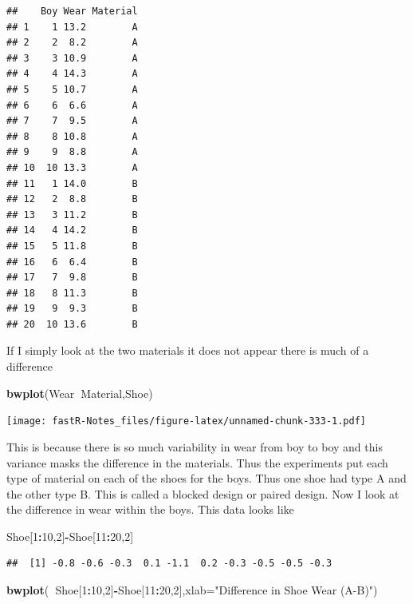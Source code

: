 \documentclass[]{book}
\newenvironment{Shaded}{\begin{snugshade}}{\end{snugshade}}
\newcommand{\KeywordTok}[1]{\textcolor[rgb]{0.13,0.29,0.53}{\textbf{#1}}}
\newcommand{\DataTypeTok}[1]{\textcolor[rgb]{0.13,0.29,0.53}{#1}}
\newcommand{\DecValTok}[1]{\textcolor[rgb]{0.00,0.00,0.81}{#1}}
\newcommand{\StringTok}[1]{\textcolor[rgb]{0.31,0.60,0.02}{#1}}
\newcommand{\OperatorTok}[1]{\textcolor[rgb]{0.81,0.36,0.00}{\textbf{#1}}}
\newcommand{\NormalTok}[1]{#1}
\theoremstyle{definition}
\theoremstyle{definition}
\theoremstyle{definition}
\theoremstyle{remark}
\begin{document}
\begin{verbatim}
##    Boy Wear Material
## 1    1 13.2        A
## 2    2  8.2        A
## 3    3 10.9        A
## 4    4 14.3        A
## 5    5 10.7        A
## 6    6  6.6        A
## 7    7  9.5        A
## 8    8 10.8        A
## 9    9  8.8        A
## 10  10 13.3        A
## 11   1 14.0        B
## 12   2  8.8        B
## 13   3 11.2        B
## 14   4 14.2        B
## 15   5 11.8        B
## 16   6  6.4        B
## 17   7  9.8        B
## 18   8 11.3        B
## 19   9  9.3        B
## 20  10 13.6        B
\end{verbatim}

If I simply look at the two materials it does not appear there is much
of a difference

\begin{Shaded}
\begin{Highlighting}[]
\KeywordTok{bwplot}\NormalTok{(Wear}\OperatorTok{~}\NormalTok{Material,Shoe)}
\end{Highlighting}
\end{Shaded}

\texttt{[image: fastR-Notes\_files/figure-latex/unnamed-chunk-333-1.pdf]}

This is because there is so much variability in wear from boy to boy and
this variance masks the difference in the materials. Thus the
experiments put each type of material on each of the shoes for the boys.
Thus one shoe had type A and the other type B. This is called a blocked
design or paired design. Now I look at the difference in wear within the
boys. This data looks like

\begin{Shaded}
\begin{Highlighting}[]
\NormalTok{Shoe[}\DecValTok{1}\OperatorTok{:}\DecValTok{10}\NormalTok{,}\DecValTok{2}\NormalTok{]}\OperatorTok{-}\NormalTok{Shoe[}\DecValTok{11}\OperatorTok{:}\DecValTok{20}\NormalTok{,}\DecValTok{2}\NormalTok{]}
\end{Highlighting}
\end{Shaded}

\begin{verbatim}
##  [1] -0.8 -0.6 -0.3  0.1 -1.1  0.2 -0.3 -0.5 -0.5 -0.3
\end{verbatim}

\begin{Shaded}
\begin{Highlighting}[]
\KeywordTok{bwplot}\NormalTok{(}\OperatorTok{~}\NormalTok{Shoe[}\DecValTok{1}\OperatorTok{:}\DecValTok{10}\NormalTok{,}\DecValTok{2}\NormalTok{]}\OperatorTok{-}\NormalTok{Shoe[}\DecValTok{11}\OperatorTok{:}\DecValTok{20}\NormalTok{,}\DecValTok{2}\NormalTok{],}\DataTypeTok{xlab=}\StringTok{"Difference in Shoe Wear (A-B)"}\NormalTok{)}
\end{Highlighting}
\end{Shaded}
\end{document}
